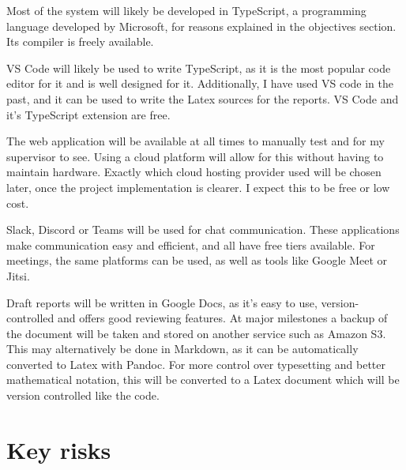 \documentclass[12pt]{article}
\begin{document}
Most of the system will likely be developed in TypeScript, a programming language developed by Microsoft, for reasons explained in the objectives section. Its compiler is freely available.

VS Code will likely be used to write TypeScript, as it is the most popular code editor for it and is well designed for it. Additionally, I have used VS code in the past, and it can be used to write the Latex sources for the reports. VS Code and it’s TypeScript extension are free.

The web application will be available at all times to manually test and for my supervisor to see. Using a cloud platform will allow for this without having to maintain hardware. Exactly which cloud hosting provider used will be chosen later, once the project implementation is clearer. I expect this to be free or low cost.

Slack, Discord or Teams will be used for chat communication. These applications make communication easy and efficient, and all have free tiers available. For meetings, the same platforms can be used, as well as tools like Google Meet or Jitsi.

Draft reports will be written in Google Docs, as it’s easy to use, version-controlled and offers good reviewing features. At major milestones a backup of the document will be taken and stored on another service such as Amazon S3. This may alternatively be done in Markdown, as it can be automatically converted to Latex with Pandoc. For more control over typesetting and better mathematical notation, this will be converted to a Latex document which will be version controlled like the code.

\section{Key risks}
\end{document}
